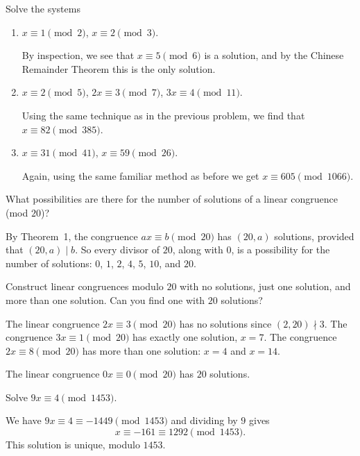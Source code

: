  Solve the systems
\begin{enumerate}
\item $x\equiv1\pmod2$, $x\equiv2\pmod3$.
  \begin{solution}
    By inspection, we see that $x\equiv5\pmod6$ is a solution, and by
    the Chinese Remainder Theorem this is the only solution.
  \end{solution}
\item $x\equiv2\pmod5$, $2x\equiv3\pmod7$, $3x\equiv4\pmod{11}$.
  \begin{solution}
    Using the same technique as in the previous problem, we find that
    $x\equiv82\pmod{385}$.
  \end{solution}
\item $x\equiv31\pmod{41}$, $x\equiv59\pmod{26}$.
  \begin{solution}
    Again, using the same familiar method as before we get
    $x\equiv605\pmod{1066}$.
  \end{solution}
\end{enumerate}

 What possibilities are there for the number of solutions of
a linear congruence (mod $20$)?
\begin{solution}
  By Theorem~1, the congruence $ax\equiv b\pmod{20}$ has $(20,a)$
  solutions, provided that $(20,a)\mid b$. So every divisor of $20$,
  along with $0$, is a possibility for the number of solutions: $0$,
  $1$, $2$, $4$, $5$, $10$, and $20$.
\end{solution}

 Construct linear congruences modulo $20$ with no solutions,
just one solution, and more than one solution. Can you find one with
$20$ solutions?
\begin{solution}
  The linear congruence $2x\equiv3\pmod{20}$ has no solutions since
  $(2,20)\nmid3$. The congruence $3x\equiv1\pmod{20}$ has exactly one
  solution, $x = 7$. The congruence $2x\equiv8\pmod{20}$ has more than
  one solution: $x = 4$ and $x = 14$.

  The linear congruence $0x\equiv0\pmod{20}$ has $20$ solutions.
\end{solution}

 Solve $9x\equiv4\pmod{1453}$.
\begin{solution}
  We have $9x\equiv4\equiv-1449\pmod{1453}$ and dividing by $9$ gives
  \begin{equation*}
    x\equiv-161\equiv1292\pmod{1453}.
  \end{equation*}
  This solution is unique, modulo $1453$.
\end{solution}

